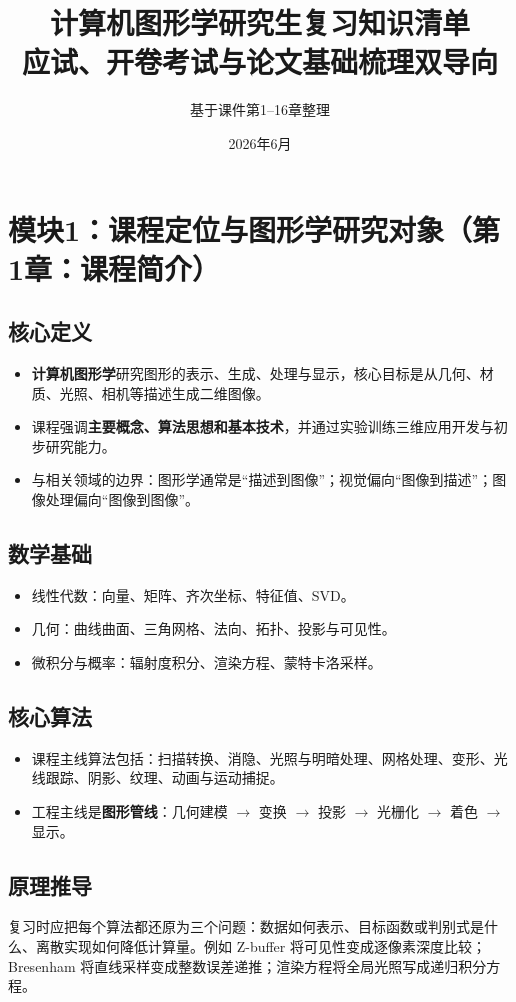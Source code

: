\documentclass[UTF8,fontset=fandol,11pt]{ctexart}
\title{\bfseries 计算机图形学研究生复习知识清单\\
\large 应试、开卷考试与论文基础梳理双导向}
\author{基于课件第1--16章整理}
\date{2026年6月}
\newcommand{\key}[1]{\textbf{#1}}
\begin{document}
\maketitle
\tableofcontents
\newpage

\section{模块1：课程定位与图形学研究对象（第1章：课程简介）}
\subsection{核心定义}
\begin{itemize}
  \item \key{计算机图形学}研究图形的表示、生成、处理与显示，核心目标是从几何、材质、光照、相机等描述生成二维图像。
  \item 课程强调\key{主要概念、算法思想和基本技术}，并通过实验训练三维应用开发与初步研究能力。
  \item 与相关领域的边界：图形学通常是``描述到图像''；视觉偏向``图像到描述''；图像处理偏向``图像到图像''。
\end{itemize}
\subsection{数学基础}
\begin{itemize}
  \item 线性代数：向量、矩阵、齐次坐标、特征值、SVD。
  \item 几何：曲线曲面、三角网格、法向、拓扑、投影与可见性。
  \item 微积分与概率：辐射度积分、渲染方程、蒙特卡洛采样。
\end{itemize}
\subsection{核心算法}
\begin{itemize}
  \item 课程主线算法包括：扫描转换、消隐、光照与明暗处理、网格处理、变形、光线跟踪、阴影、纹理、动画与运动捕捉。
  \item 工程主线是\key{图形管线}：几何建模 $\rightarrow$ 变换 $\rightarrow$ 投影 $\rightarrow$ 光栅化 $\rightarrow$ 着色 $\rightarrow$ 显示。
\end{itemize}
\subsection{原理推导}
复习时应把每个算法都还原为三个问题：数据如何表示、目标函数或判别式是什么、离散实现如何降低计算量。例如 Z-buffer 将可见性变成逐像素深度比较；Bresenham 将直线采样变成整数误差递推；渲染方程将全局光照写成递归积分方程。
\end{document}
